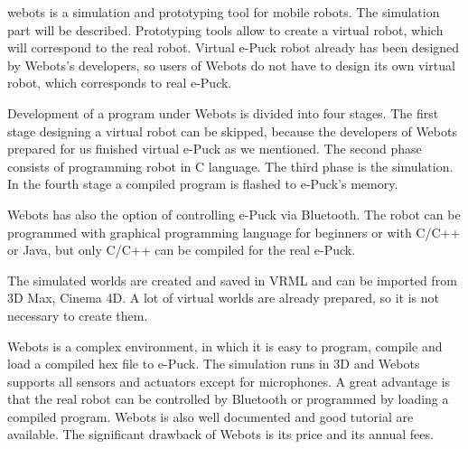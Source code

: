   webots is a simulation and prototyping tool for mobile robots.
  The simulation part will be described.  Prototyping tools allow to create a virtual robot,
  which will correspond to the real robot.
  Virtual e-Puck robot already has been designed
  by Webots's developers, so users of Webots do not have to design its own virtual robot, 
  which corresponds to real e-Puck.
  
  Development of a program under Webots is divided into four stages. 
  The first stage designing a virtual robot can be skipped,
  because the developers of Webots prepared for us finished virtual e-Puck as we mentioned.
  The second phase consists of programming robot in C language. 
  The third phase is the simulation. In the fourth stage a compiled program is flashed to e-Puck's memory.
  
  Webots has also the option of controlling e-Puck via Bluetooth.
  The robot can be programmed with graphical programming language for beginners or with C/C++ or Java,
  but only C/C++ can be compiled for the real e-Puck.
  
  The simulated worlds are created and saved in VRML and can be imported 
  from 3D Max, Cinema 4D.
  A lot of virtual worlds are already prepared, so it is not necessary to create them.
  
  Webots is a complex environment, in which it is easy to program, compile and load 
  a compiled hex file to e-Puck.
  The simulation runs in 3D and Webots supports all sensors and actuators except for microphones.
  A great advantage is that the real robot can be controlled by Bluetooth or
  programmed by loading a compiled program.
  Webots is also well documented and good tutorial are available.
  The significant drawback of Webots is its price and its annual fees.
  
